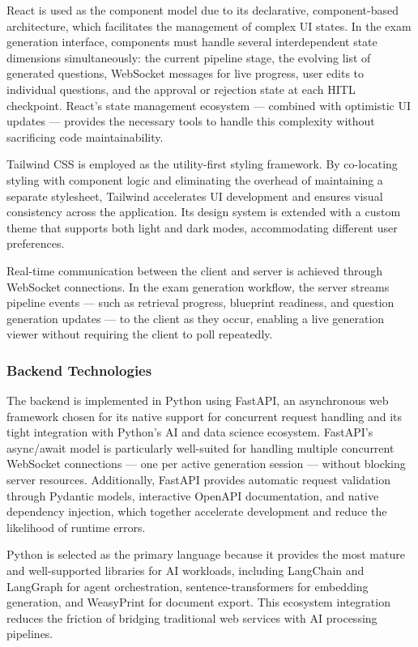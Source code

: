 \documentclass[12pt,a4paper]{article}
\begin{document}
React is used as the component model due to its declarative, component-based architecture, which facilitates the management of complex UI states. In the exam generation interface, components must handle several interdependent state dimensions simultaneously: the current pipeline stage, the evolving list of generated questions, WebSocket messages for live progress, user edits to individual questions, and the approval or rejection state at each HITL checkpoint. React's state management ecosystem — combined with optimistic UI updates — provides the necessary tools to handle this complexity without sacrificing code maintainability.

Tailwind CSS is employed as the utility-first styling framework. By co-locating styling with component logic and eliminating the overhead of maintaining a separate stylesheet, Tailwind accelerates UI development and ensures visual consistency across the application. Its design system is extended with a custom theme that supports both light and dark modes, accommodating different user preferences.

Real-time communication between the client and server is achieved through WebSocket connections. In the exam generation workflow, the server streams pipeline events — such as retrieval progress, blueprint readiness, and question generation updates — to the client as they occur, enabling a live generation viewer without requiring the client to poll repeatedly.

\subsubsection{Backend Technologies}

The backend is implemented in Python using FastAPI, an asynchronous web framework chosen for its native support for concurrent request handling and its tight integration with Python's AI and data science ecosystem. FastAPI's async/await model is particularly well-suited for handling multiple concurrent WebSocket connections — one per active generation session — without blocking server resources. Additionally, FastAPI provides automatic request validation through Pydantic models, interactive OpenAPI documentation, and native dependency injection, which together accelerate development and reduce the likelihood of runtime errors.

Python is selected as the primary language because it provides the most mature and well-supported libraries for AI workloads, including LangChain and LangGraph for agent orchestration, sentence-transformers for embedding generation, and WeasyPrint for document export. This ecosystem integration reduces the friction of bridging traditional web services with AI processing pipelines.
\end{document}
